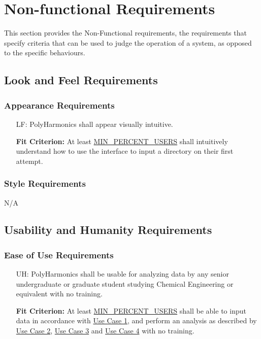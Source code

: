 \documentclass[12pt]{article}
\newcounter{lafnum}
\newcounter{uahnum}
\newcommand{\progname}{PolyHarmonics}
\begin{document}
\begin{itemize}

\end{itemize}

\section{Non-functional Requirements}

This section provides the Non-Functional requirements, the requirements that
specify criteria that can be used to judge the operation of a system, as opposed
to the specific behaviours.

\subsection{Look and Feel Requirements}

\subsubsection{Appearance Requirements}
\noindent \begin{itemize}
\item[LF\refstepcounter{lafnum}\thelafnum\label{NF_laf1}:] \progname{} shall
  appear visually intuitive.
						
  \textbf{Fit Criterion:} At least \hyperref[AppendA]{MIN\_PERCENT\_USERS}
  shall intuitively understand how to use the interface to input a directory on
  their first attempt.
\end{itemize}

\subsubsection{Style Requirements}

N/A

\subsection{Usability and Humanity Requirements}

\subsubsection{Ease of Use Requirements}

\noindent \begin{itemize}
\item[UH\refstepcounter{uahnum}\theuahnum\label{NF_uah1}:] \progname{} shall be
  usable for analyzing data by any senior undergraduate or graduate student 
  studying Chemical Engineering or equivalent with no training.

  \textbf{Fit Criterion:} At least \hyperref[AppendA]{MIN\_PERCENT\_USERS}
  shall be able to input data in accordance with \hyperref[UseCase]{Use Case 
1}, and perform an analysis as described by \hyperref[UseCase]{Use Case 
2}, \hyperref[UseCase]{Use Case 3} and \hyperref[UseCase]{Use Case 4}
 with no training.
\end{itemize}
\end{document}
